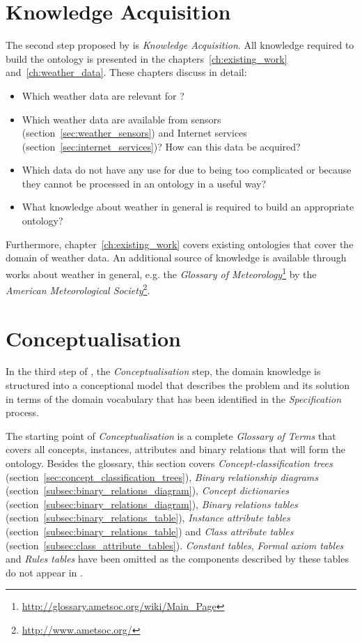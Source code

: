 \section{Knowledge Acquisition}

The second step proposed by \methontology is \emph{Knowledge Acquisition}. All knowledge required to build the \thinkhomeweather ontology is presented in the chapters~\ref{ch:existing_work} and~\ref{ch:weather_data}. These chapters discuss in detail:

\begin{itemize}
  \item Which weather data are relevant for \thinkhome?
  \item Which weather data are available from sensors (section~\ref{sec:weather_sensors}) and Internet services (section~\ref{sec:internet_services})? How can this data be acquired?
  \item Which data do not have any use for \thinkhomeweather due to being too complicated or because they cannot be processed in an ontology in a useful way?
  \item What knowledge about weather in general is required to build an appropriate ontology? %
\end{itemize}

Furthermore, chapter~\ref{ch:existing_work} covers existing ontologies that cover the domain of weather data. An additional source of knowledge is available through works about weather in general, e.g. the \emph{Glossary of Meteorology}\footnote{\href{http://glossary.ametsoc.org/wiki/Main\_Page}{http://glossary.ametsoc.org/wiki/Main\_Page}} by the \emph{American Meteorological Society}\footnote{\href{http://www.ametsoc.org/}{http://www.ametsoc.org/}}\cite{GlossaryOfMeteorology}.

\section{Conceptualisation}

In the third step of \methontology, the \emph{Conceptualisation} step, the domain knowledge is structured into a conceptional model that describes the problem and its solution in terms of the domain vocabulary that has been identified in the \emph{Specification} process.

The starting point of \emph{Conceptualisation} is a complete \emph{Glossary of Terms} that covers all concepts, instances, attributes and binary relations that will form the ontology. Besides the glossary, this section covers \emph{Concept-classification trees} (section~\ref{sec:concept_classification_trees}), \emph{Binary relationship diagrams} (section~\ref{subsec:binary_relations_diagram}), \emph{Concept dictionaries} (section~\ref{subsec:binary_relations_diagram}), \emph{Binary relations tables} (section~\ref{subsec:binary_relations_table}), \emph{Instance attribute tables} (section~\ref{subsec:binary_relations_table}) and \emph{Class attribute tables} (section~\ref{subsec:class_attribute_tables}). \emph{Constant tables}, \emph{Formal axiom tables} and \emph{Rules tables} have been omitted as the components described by these tables do not appear in \thinkhomeweather.

